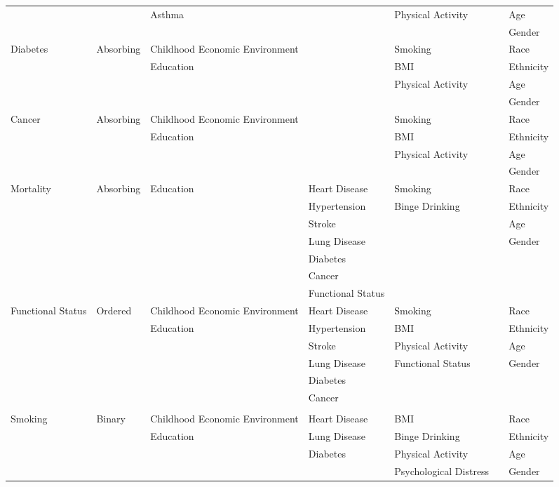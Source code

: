 \begin{table}
\begin{scriptsize}
\begin{tabular}{lllllll}
&           & Asthma &  & Physical Activity &  & Age \\
&           &        &  &  &  & Gender \\
\midrule		
Diabetes  & Absorbing & Childhood Economic Environment &   & Smoking   &                                & Race \\
&           & Education &  & BMI &  & Ethnicity \\
&           &  &  & Physical Activity &  & Age \\
&           &        &  &  &  & Gender \\
\midrule		
Cancer & Absorbing & Childhood Economic Environment &     & Smoking   &                                & Race \\
&           & Education & & BMI &  & Ethnicity \\
&           &  &  & Physical Activity &  & Age \\
&           &        & &  &  & Gender \\
\midrule
Mortality & Absorbing & Education & Heart Disease & Smoking &  & Race \\
&&  & Hypertension & Binge Drinking  & & Ethnicity \\
&& & Stroke & & & Age \\
&& & Lung Disease & & & Gender \\
&& & Diabetes & & & \\
&& & Cancer & & & \\
&& & Functional Status & & & \\
\midrule	
Functional Status & Ordered & Childhood Economic Environment & Heart Disease & Smoking & & Race \\
			&& Education & Hypertension & BMI &  & Ethnicity \\
			&&  & Stroke & Physical Activity & & Age \\
			&&  &  Lung Disease & Functional Status & & Gender \\
			&&  & Diabetes &  &  & \\
			&&  & Cancer & & & \\
			&&  &   &  &  & \\
\midrule
Smoking & Binary & Childhood Economic Environment & Heart Disease  & BMI & & Race \\
& & Education &  Lung Disease & Binge Drinking & & Ethnicity \\
&  &  & Diabetes & Physical Activity  & & Age \\
&  & &  & Psychological Distress & & Gender \\
\bottomrule
\end{tabular}
\end{scriptsize}
\end{table}


